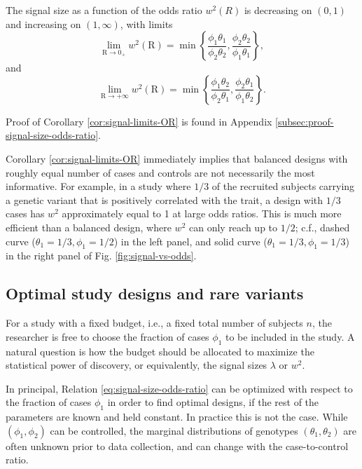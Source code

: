 \begin{corollary} \label{cor:signal-limits-OR}
The signal size as a function of the odds ratio $w^2(R)$ is decreasing on $(0,1)$ and increasing on $(1,\infty)$, with limits
\begin{equation} \label{eq:signal-size-upper-bound-1}
    \lim_{\text{R}\to0_+} w^2(\text{R}) = \min\left\{\frac{\phi_1\theta_1}{\phi_2\theta_2}, \frac{\phi_2\theta_2}{\phi_1\theta_1}\right\},
\end{equation}
and
\begin{equation} \label{eq:signal-size-upper-bound-2}
    \lim_{\text{R}\to+\infty} w^2(\text{R}) = \min\left\{\frac{\phi_1\theta_2}{\phi_2\theta_1}, \frac{\phi_2\theta_1}{\phi_1\theta_2}\right\}.
\end{equation}
\end{corollary}
Proof of Corollary \ref{cor:signal-limits-OR} is found in Appendix \ref{subsec:proof-signal-size-odds-ratio}. 

Corollary \ref{cor:signal-limits-OR} immediately implies that balanced designs with roughly equal number of cases and controls are not necessarily the most informative.
For example, in a study where $1/3$ of the recruited subjects carrying a genetic variant that is positively correlated with the trait, a design with $1/3$ cases has $w^2$ approximately equal to 1 at large odds ratios.
This is much more efficient than a balanced design, where $w^2$ can only reach up to $1/2$; c.f., dashed curve ($\theta_1=1/3,\phi_1=1/2$) in the left panel, and solid curve ($\theta_1=1/3,\phi_1=1/3$) in the right panel of Fig. \ref{fig:signal-vs-odds}.

\subsection{Optimal study designs and rare variants}
\label{subsec:optimal-design} 

For a study with a fixed budget, i.e., a fixed total number of subjects $n$, the researcher is free to choose the fraction of cases $\phi_1$ to be included in the study.
A natural question is how the budget should be allocated to maximize the statistical power of discovery, or equivalently, the signal sizes $\lambda$ or $w^2$.

In principal, Relation \eqref{eq:signal-size-odds-ratio} can be optimized with respect to the fraction of cases $\phi_1$ in order to find optimal designs, if the rest of the parameters are known and held constant.
In practice this is not the case.
While $(\phi_1, \phi_2)$ can be controlled, the marginal distributions of genotypes $(\theta_1, \theta_2)$ are often unknown prior to data collection, and can change with the case-to-control ratio.

